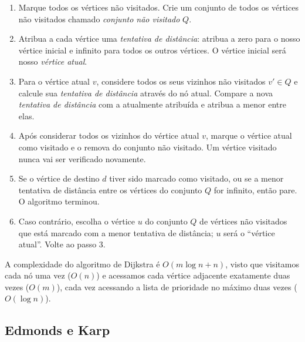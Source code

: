 \documentclass[12pt, a4]{article}
\begin{document}
\begin{enumerate}
\item Marque todos os vértices não visitados. Crie um conjunto de todos os
    vértices não visitados chamado \emph{conjunto não visitado} $Q$.
\item Atribua a cada vértice uma \emph{tentativa de distância}: atribua a zero
    para o nosso vértice inicial e infinito para todos os outros vértices. O
    vértice inicial será nosso \emph{vértice atual}.
\item Para o vértice atual $v$, considere todos os seus vizinhos não visitados
    $v' \in Q$ e calcule sua \emph{tentativa de distância} através do nó atual.
    Compare a nova \emph{tentativa de distância} com a atualmente atribuída e
    atribua a menor entre elas.
\item Após considerar todos os vizinhos do vértice atual $v$, marque o vértice
    atual como visitado e o remova do conjunto não visitado. Um vértice visitado
    nunca vai ser verificado novamente.
\item Se o vértice de destino $d$ tiver sido marcado como visitado, ou se a
    menor tentativa de distância entre os vértices do conjunto $Q$ for infinito,
    então pare. O algoritmo terminou.
\item Caso contrário, escolha o vértice $u$ do conjunto $Q$ de vértices não
    visitados que está marcado com a menor tentativa de distância; $u$ será o
    ``vértice atual''. Volte ao passo 3.
\end{enumerate}

A complexidade do algoritmo de Dijkstra é $O(m \log n + n)$, visto que visitamos
cada nó uma vez ($O(n)$) e acessamos cada vértice adjacente exatamente duas
vezes ($O(m)$), cada vez acessando a lista de prioridade no máximo duas vezes
($O(\log n)$).

\subsection{Edmonds e Karp}
\label{subsec:edmonds-karp}
\end{document}
